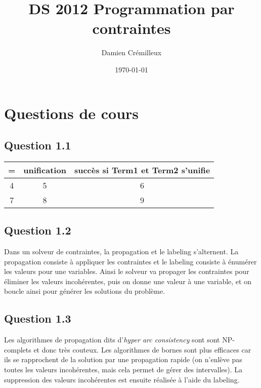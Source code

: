 \documentclass[a4paper]{article}
\begin{document}
\title{DS 2012 Programmation par contraintes}
\author{Damien Crémilleux}
\date{\today}

\maketitle


\section{Questions de cours}

\subsection{Question 1.1}
\begin{center}
  \begin{tabular}{| c | c | c |}
    \hline
    = & unification & succès si Term1 et Term2 s'unifie \\ \hline
    4 & 5 & 6 \\ \hline
    7 & 8 & 9 \\ \hline
  \end{tabular}
\end{center}
\subsection{Question 1.2}
Dans un solveur de contraintes, la propagation et le labeling s'alternent. La propagation consiste à appliquer les contraintes et le labeling consiste à énumérer les valeurs pour une variables. Ainsi le solveur va propager les contraintes pour éliminer les valeurs incohérentes, puis on donne une valeur à une variable, et on boucle ainsi pour générer les solutions du problème.

\subsection{Question 1.3}
Les algorithmes de propagation dits d'\textit{hyper arc consistency} sont sont NP-complets et donc très couteux. Les algorithmes de bornes sont plus efficaces car ils se rapprochent de la solution par une propagation rapide (on n'enlève pas toutes les valeurs incohérentes, mais cela permet de gérer des intervalles). La suppression des valeurs incohérentes est ensuite réalisée à l'aide du labeling.
\end{document}
